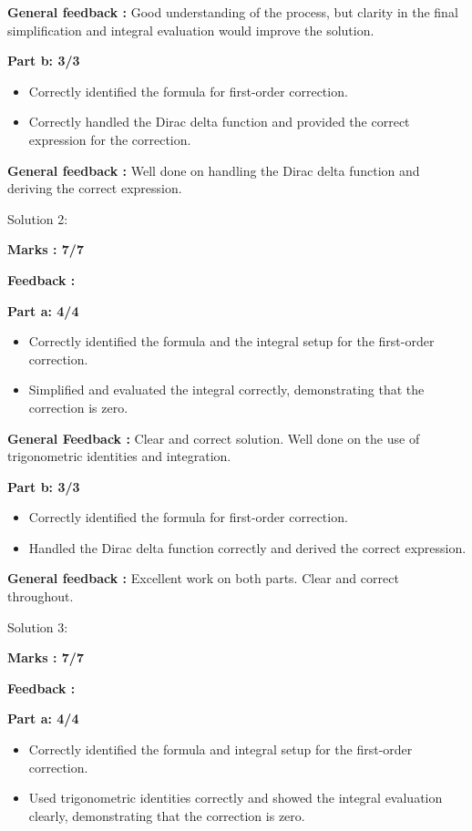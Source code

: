 \documentclass[a4paper,11pt]{article}
\begin{document}
\textbf{General feedback :}
Good understanding of the process, but clarity in the final simplification and integral evaluation would improve the solution.


\textbf{Part b: 3/3}
\begin{itemize}
    \item Correctly identified the formula for first-order correction.
    \item Correctly handled the Dirac delta function and provided the correct expression for the correction.
\end{itemize}

\textbf{General feedback :}
Well done on handling the Dirac delta function and deriving the correct expression.



Solution 2:

\textbf{ Marks : 7/7}

\textbf{Feedback :}

\textbf{Part a: 4/4}

\begin{itemize}
    \item Correctly identified the formula and the integral setup for the first-order correction.
    \item Simplified and evaluated the integral correctly, demonstrating that the correction is zero.
\end{itemize}

\textbf{General Feedback :}
Clear and correct solution. Well done on the use of trigonometric identities and integration.


\textbf{Part b: 3/3}
\begin{itemize}
    \item Correctly identified the formula for first-order correction.
    \item Handled the Dirac delta function correctly and derived the correct expression.
\end{itemize}

\textbf{General feedback :}
Excellent work on both parts. Clear and correct throughout.



Solution 3:


\textbf{ Marks : 7/7}

\textbf{Feedback :}

\textbf{Part a: 4/4}

\begin{itemize}
    \item Correctly identified the formula and integral setup for the first-order correction.
    \item Used trigonometric identities correctly and showed the integral evaluation clearly, demonstrating that the correction is zero.
\end{itemize}
\end{document}
